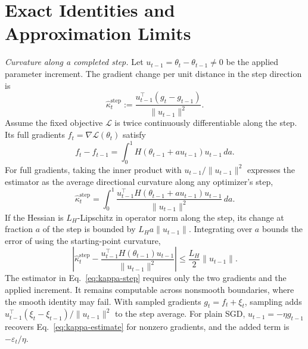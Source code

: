 \appendices
\section{Exact Identities and Approximation Limits}
\label{app:math}

\emph{Curvature along a completed step.} Let $u_{t-1}=\theta_t-\theta_{t-1}\ne0$ be the applied parameter increment. The gradient change per unit distance in the step direction is
\begin{equation}
 \boxed{\widehat\kappa_t^{\mathrm{step}}
   :=\frac{u_{t-1}^{\top}(g_t-g_{t-1})}{\|u_{t-1}\|^2}.}
 \label{eq:kappa-step}
\end{equation}
Assume the fixed objective $\mathcal L$ is twice continuously differentiable along the step. Its full gradients $f_t=\nabla\mathcal L(\theta_t)$ satisfy
\begin{equation}
 f_t-f_{t-1}=\int_0^1H(\theta_{t-1}+a u_{t-1})u_{t-1}\,da.
 \label{eq:app-gradient-integral}
\end{equation}
For full gradients, taking the inner product with $u_{t-1}/\|u_{t-1}\|^2$ expresses the estimator as the average directional curvature along any optimizer's step,
\begin{equation}
 \widehat\kappa_t^{\mathrm{step}}=
 \int_0^1\frac{u_{t-1}^{\top}H(\theta_{t-1}+a u_{t-1})u_{t-1}}
 {\|u_{t-1}\|^2}\,da.
 \label{eq:step-path-average}
\end{equation}
If the Hessian is $L_H$-Lipschitz in operator norm along the step, its change at fraction $a$ of the step is bounded by $L_Ha\|u_{t-1}\|$. Integrating over $a$ bounds the error of using the starting-point curvature,
\begin{equation}
 \left|\widehat\kappa_t^{\mathrm{step}}-
 \frac{u_{t-1}^{\top}H(\theta_{t-1})u_{t-1}}{\|u_{t-1}\|^2}\right|
 \leq \frac{L_H}{2}\|u_{t-1}\|.
 \label{eq:app-curvature-bound}
\end{equation}
The estimator in Eq.~\eqref{eq:kappa-step} requires only the two gradients and the applied increment. It remains computable across nonsmooth boundaries, where the smooth identity may fail. With sampled gradients $g_t=f_t+\xi_t$, sampling adds $u_{t-1}^\top(\xi_t-\xi_{t-1})/\|u_{t-1}\|^2$ to the step average. For plain SGD, $u_{t-1}=-\eta g_{t-1}$ recovers Eq.~\eqref{eq:kappa-estimate} for nonzero gradients, and the added term is $-\varepsilon_t/\eta$.


